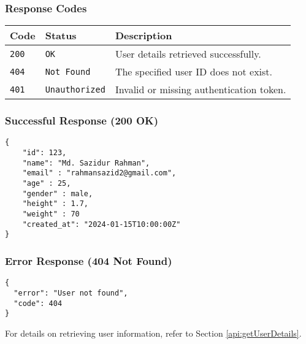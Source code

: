 \documentclass[11pt, a4paper]{article}
\begin{document}
\subsubsection*{Response Codes}
\begin{tabularx}{\linewidth}{|l|l|X|}
    \hline
    \textbf{Code} & \textbf{Status} & \textbf{Description} \\
    \hline
    \texttt{200} & \texttt{OK} & User details retrieved successfully. \\
    \hline
    \texttt{404} & \texttt{Not Found} & The specified user ID does not exist. \\
    \hline
    \texttt{401} & \texttt{Unauthorized} & Invalid or missing authentication token. \\
    \hline
\end{tabularx}

\subsubsection*{Successful Response (200 OK)}
\begin{lstlisting}[style=jsonstyle]
{
    "id": 123,
    "name": "Md. Sazidur Rahman",
    "email" : "rahmansazid2@gmail.com",
    "age" : 25,
    "gender" : male,
    "height" : 1.7,
    "weight" : 70
    "created_at": "2024-01-15T10:00:00Z"
}
\end{lstlisting}

\subsubsection*{Error Response (404 Not Found)}
\begin{lstlisting}[style=jsonstyle]
{
  "error": "User not found",
  "code": 404
}
\end{lstlisting}

For details on retrieving user information, refer to Section \ref{api:getUserDetails}.
\end{document}
